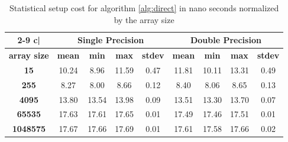 \documentclass[preprint,1p,times]{elsarticle}
\begin{document}
\begin{table}[h]
	\begin{tabular}{| c | c c c c | c c c c |}
		\cline{2-9}
		\multicolumn{1} {c|}{}  & \multicolumn{4}{c|}{\textbf{Single Precision}}  & \multicolumn{4}{c|}{\textbf{Double Precision}} \\
		\hline
		\textbf{array size} & \textbf{mean} & \textbf{min} & \textbf{max} & \textbf{stdev} & \textbf{mean} & \textbf{min} & \textbf{max} & \textbf{stdev} \\
		\hline
		\multicolumn{1}{|c|}{\textbf{15}                                    } &      10.24 &       8.96 &      11.59 &       0.47 &      11.81 &      10.11 &      13.31 &       0.49 \\
		\multicolumn{1}{|c|}{\textbf{255}                                   } &       8.27 &       8.00 &       8.66 &       0.12 &       8.40 &       8.06 &       8.65 &       0.13 \\
		\multicolumn{1}{|c|}{\textbf{4095}                                  } &      13.80 &      13.54 &      13.98 &       0.09 &      13.51 &      13.30 &      13.70 &       0.07 \\
		\multicolumn{1}{|c|}{\textbf{65535}                                 } &      17.63 &      17.61 &      17.65 &       0.01 &      17.49 &      17.46 &      17.51 &       0.01 \\
		\multicolumn{1}{|c|}{\textbf{1048575}                               } &      17.67 &      17.66 &      17.69 &       0.01 &      17.61 &      17.58 &      17.66 &       0.02 \\
		\hline
	\end{tabular}
	\caption{Statistical setup cost for algorithm \ref{alg:direct} in nano seconds normalized by the array size}
	\label{tab:results100}
\end{table}
\end{document}
